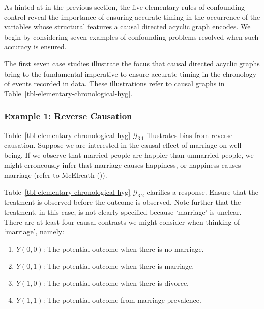 \documentclass[
  single column]{article}
\providecommand{\tightlist}{%
  \setlength{\itemsep}{0pt}\setlength{\parskip}{0pt}}\usepackage{longtable,booktabs,array}
\begin{document}
\begin{table}

\caption{\label{tbl-elementary-chronological-hyg}}

\centering{

\captionsetup{labelsep=none}

\terminologychronologicalhygeine

}

\end{table}%

As hinted at in the previous section, the five elementary rules of
confounding control reveal the importance of ensuring accurate timing in
the occurrence of the variables whose structural features a causal
directed acyclic graph encodes. We begin by considering seven examples
of confounding problems resolved when such accuracy is ensured.

The first seven case studies illustrate the focus that causal directed
acyclic graphs bring to the fundamental imperative to ensure accurate
timing in the chronology of events recorded in data. These illustrations
refer to causal graphs in Table~\ref{tbl-elementary-chronological-hyg}.

\subsubsection{Example 1: Reverse
Causation}\label{example-1-reverse-causation}

Table~\ref{tbl-elementary-chronological-hyg} \(\mathcal{G}_{3.1}\)
illustrates bias from reverse causation. Suppose we are interested in
the causal effect of marriage on well-being. If we observe that married
people are happier than unmarried people, we might erroneously infer
that marriage causes happiness, or happiness causes marriage (refer to
McElreath ()).

Table~\ref{tbl-elementary-chronological-hyg} \(\mathcal{G}_{3.2}\)
clarifies a response. Ensure that the treatment is observed before the
outcome is observed. Note further that the treatment, in this case, is
not clearly specified because `marriage' is unclear. There are at least
four causal contrasts we might consider when thinking of `marriage',
namely:

\begin{enumerate}
\def\labelenumi{\arabic{enumi}.}
\tightlist
\item
  \(Y(0, 0)\): The potential outcome when there is no marriage.
\item
  \(Y(0, 1)\): The potential outcome when there is marriage.
\item
  \(Y(1, 0)\): The potential outcome when there is divorce.
\item
  \(Y(1, 1)\): The potential outcome from marriage prevalence.
\end{enumerate}
\end{document}
